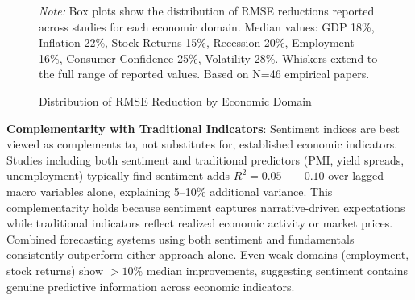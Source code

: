 \documentclass[11pt,twocolumn]{article}
\begin{document}
\begin{figure}[t]
\centering
\caption{Distribution of RMSE Reduction by Economic Domain}
\label{fig:performance_dist}
\raggedright\footnotesize
\textit{Note:} Box plots show the distribution of RMSE reductions reported across studies for each economic domain. Median values: GDP 18\%, Inflation 22\%, Stock Returns 15\%, Recession 20\%, Employment 16\%, Consumer Confidence 25\%, Volatility 28\%. Whiskers extend to the full range of reported values. Based on N=46 empirical papers.
\end{figure}

\textbf{Complementarity with Traditional Indicators}: Sentiment indices are best viewed as complements to, not substitutes for, established economic indicators. Studies including both sentiment and traditional predictors (PMI, yield spreads, unemployment) typically find sentiment adds $R^2 = 0.05--0.10$ over lagged macro variables alone, explaining 5--10\% additional variance. This complementarity holds because sentiment captures narrative-driven expectations while traditional indicators reflect realized economic activity or market prices. Combined forecasting systems using both sentiment and fundamentals consistently outperform either approach alone. Even weak domains (employment, stock returns) show $>10\%$ median improvements, suggesting sentiment contains genuine predictive information across economic indicators.
\end{document}
